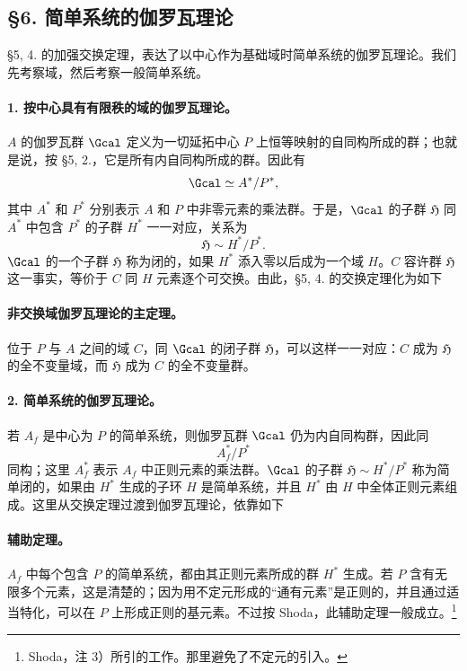 \subsection*{§6. 简单系统的伽罗瓦理论}

§5, 4. 的加强交换定理，表达了以中心作为基础域时简单系统的伽罗瓦理论。我们先考察域，然后考察一般简单系统。

\paragraph{1. 按中心具有有限秩的域的伽罗瓦理论。}
\(A\) 的伽罗瓦群 \(\Gcal\) 定义为一切延拓中心 \(P\) 上恒等映射的自同构所成的群；也就是说，按 §5, 2.，它是所有内自同构所成的群。因此有
\[
        \Gcal \simeq A^*/P^*,
\]
其中 \(A^*\) 和 \(P^*\) 分别表示 \(A\) 和 \(P\) 中非零元素的乘法群。于是，\(\Gcal\) 的子群 \(\mathfrak H\) 同 \(A^*\) 中包含 \(P^*\) 的子群 \(H^*\) 一一对应，关系为
\[
        \mathfrak H \sim H^*/P^* .
\]
\(\Gcal\) 的一个子群 \(\mathfrak H\) 称为闭的，如果 \(H^*\) 添入零以后成为一个域 \(H\)。\(C\) 容许群 \(\mathfrak H\) 这一事实，等价于 \(C\) 同 \(H\) 元素逐个可交换。由此，§5, 4. 的交换定理化为如下

\paragraph{非交换域伽罗瓦理论的主定理。}
位于 \(P\) 与 \(A\) 之间的域 \(C\)，同 \(\Gcal\) 的闭子群 \(\mathfrak H\)，可以这样一一对应：\(C\) 成为 \(\mathfrak H\) 的全不变量域，而 \(\mathfrak H\) 成为 \(C\) 的全不变量群。

\paragraph{2. 简单系统的伽罗瓦理论。}
若 \(A_f\) 是中心为 \(P\) 的简单系统，则伽罗瓦群 \(\Gcal\) 仍为内自同构群，因此同
\[
        A_f^*/P^*
\]
同构；这里 \(A_f^*\) 表示 \(A_f\) 中正则元素的乘法群。\(\Gcal\) 的子群 \(\mathfrak H\sim H^*/P^*\) 称为简单闭的，如果由 \(H^*\) 生成的子环 \(H\) 是简单系统，并且 \(H^*\) 由 \(H\) 中全体正则元素组成。这里从交换定理过渡到伽罗瓦理论，依靠如下

\paragraph{辅助定理。}
\(A_f\) 中每个包含 \(P\) 的简单系统，都由其正则元素所成的群 \(H^*\) 生成。若 \(P\) 含有无限多个元素，这是清楚的；因为用不定元形成的“通有元素”是正则的，并且通过适当特化，可以在 \(P\) 上形成正则的基元素。不过按 Shoda，此辅助定理一般成立。\footnote{Shoda，注 3）所引的工作。那里避免了不定元的引入。}

